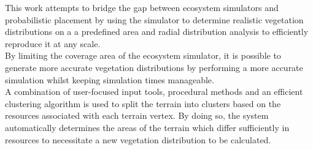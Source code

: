 This work attempts to bridge the gap between ecosystem simulators and probabilistic placement by using the simulator to determine realistic vegetation distributions on a a predefined area and radial distribution analysis to efficiently reproduce it at any scale.\\
By limiting the coverage area of the ecosystem simulator, it is possible to generate more accurate vegetation distributions by performing a more accurate simulation whilst keeping simulation times manageable.\\
A combination of user-focused input tools, procedural methods and an efficient clustering algorithm is used to split the terrain into clusters based on the resources associated with each terrain vertex. By doing so, the system automatically determines the areas of the terrain which differ sufficiently in resources to necessitate a new vegetation distribution to be calculated.\\


